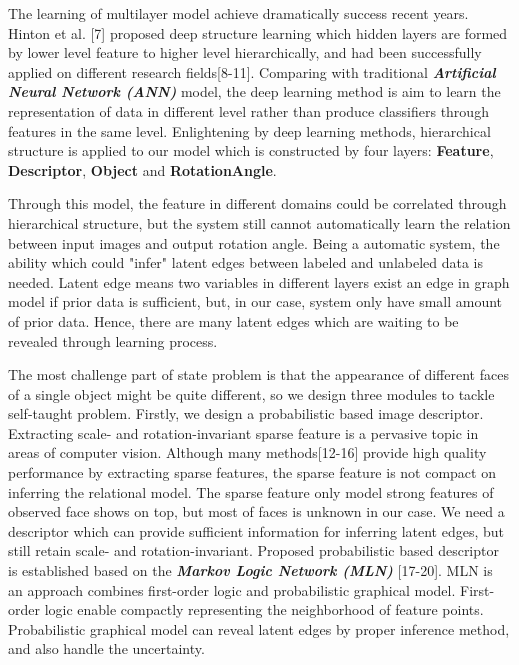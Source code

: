 \documentclass[journal]{IEEEtran}
\begin{document}
The learning of multilayer model achieve dramatically success recent years. Hinton et al. [7] proposed deep structure learning which hidden layers are formed by lower level feature to higher level hierarchically, and had been successfully applied on different research fields[8-11]. Comparing with traditional \textbf{\textit{Artificial Neural Network (ANN)}} model, the deep learning method is aim to learn the representation of data in different level rather than produce classifiers through features in the same level. Enlightening by deep learning methods, hierarchical structure is applied to our model which is constructed by four layers: \textbf{Feature}, \textbf{Descriptor}, \textbf{Object} and \textbf{RotationAngle}.

Through this model, the feature in different domains could be correlated through hierarchical structure, but the system still cannot automatically learn the relation between input images and output rotation angle. Being a automatic system, the ability which could "infer" latent edges between labeled and unlabeled data is needed. Latent edge means two variables in different layers exist an edge in graph model if prior data is sufficient, but, in our case, system only have small amount of prior data. Hence, there are many latent edges which are waiting to be revealed through learning process. 

The most challenge part of state problem is that the appearance of different faces of a single object might be quite different, so we design three modules to tackle self-taught problem. Firstly, we design a probabilistic based image descriptor. Extracting scale- and rotation-invariant sparse feature is a pervasive topic in areas of computer vision. Although many methods[12-16] provide high quality performance by extracting sparse features, the sparse feature is not compact on inferring the relational model. The sparse feature only model strong features of observed face shows on top, but most of faces is unknown in our case. We need a descriptor which can provide sufficient information for inferring latent edges, but still retain scale- and rotation-invariant. Proposed probabilistic based descriptor is established based on the \textit{\textbf{Markov Logic Network (MLN)}} [17-20]. MLN is an approach combines first-order logic and probabilistic graphical model. First-order logic enable compactly representing the neighborhood of feature points. Probabilistic graphical model can reveal latent edges by proper inference method, and also handle the uncertainty. 
\end{document}
